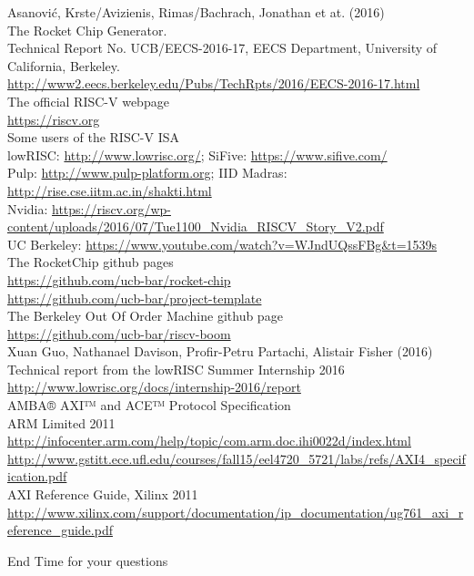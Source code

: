 \documentclass[]{beamer} %
\begin{document}



\tiny
\begin{thebibliography}{9}
		Asanović, Krste/Avizienis, Rimas/Bachrach, Jonathan et at. (2016)\\
		The Rocket Chip Generator.\\
		Technical Report No. UCB/EECS-2016-17, EECS Department, University of California, Berkeley.\\
		\url{http://www2.eecs.berkeley.edu/Pubs/TechRpts/2016/EECS-2016-17.html}\\

		The official RISC-V webpage\\
		\url{https://riscv.org}\\

		Some users of the RISC-V ISA\\
		lowRISC: \url{http://www.lowrisc.org/}; SiFive: \url{https://www.sifive.com/}\\
		Pulp: \url{http://www.pulp-platform.org}; IID Madras: \url{http://rise.cse.iitm.ac.in/shakti.html}\\
		Nvidia: \url{https://riscv.org/wp-content/uploads/2016/07/Tue1100_Nvidia_RISCV_Story_V2.pdf}\\
		UC Berkeley: \url{https://www.youtube.com/watch?v=WJndUQssFBg&t=1539s}\\

		The RocketChip github pages\\
		\url{https://github.com/ucb-bar/rocket-chip}\\
		\url{https://github.com/ucb-bar/project-template}\\

		The Berkeley Out Of Order Machine github page\\
		\url{https://github.com/ucb-bar/riscv-boom}\\

		Xuan Guo, Nathanael Davison, Profir-Petru Partachi, Alistair Fisher (2016)\\
		Technical report from the lowRISC Summer Internship 2016\\
		\url{http://www.lowrisc.org/docs/internship-2016/report}\\

		AMBA® AXI™ and ACE™ Protocol Specification\\
		ARM Limited 2011\\
		\url{http://infocenter.arm.com/help/topic/com.arm.doc.ihi0022d/index.html}\\
		\url{http://www.gstitt.ece.ufl.edu/courses/fall15/eel4720_5721/labs/refs/AXI4_specification.pdf}\\

		AXI Reference Guide, Xilinx 2011\\
		\url{http://www.xilinx.com/support/documentation/ip_documentation/ug761_axi_reference_guide.pdf}\\
\end{thebibliography}


\begin{frame}{\Huge End}
	\huge Time for your questions
\end{frame}
\end{document}
